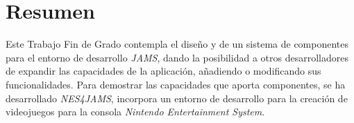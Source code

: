 \chapter{Resumen} \label{ch:resumen}

Este Trabajo  Fin de Grado contempla el diseño y
 de un sistema de
componentes para el entorno de desarrollo \textit{JAMS}, dando la
posibilidad a otros desarrolladores de expandir las capacidades de la
aplicación, añadiendo o modificando sus funcionalidades. Para
demostrar las capacidades que aporta componentes, se ha desarrollado 
\textit{NES4JAMS},  incorpora un entorno
de desarrollo para la creación de videojuegos para la consola
\textit{Nintendo Entertainment System}.
